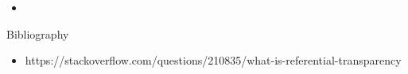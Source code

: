 \documentclass{beamer}
\newcommand{\link}[2]{\href{#2}{\color{blue}{#1}}}
\begin{document}
\begin{frame}{}
\begin{itemize}
	\item
\end{itemize}
\end{frame}

\begin{frame}{Bibliography}
\begin{itemize}
	\item \link{Referential transparency}{https://stackoverflow.com/questions/210835/what-is-referential-transparency}{https://stackoverflow.com/questions/210835/what-is-referential-transparency}
\end{itemize}
\end{frame}
\end{document}
